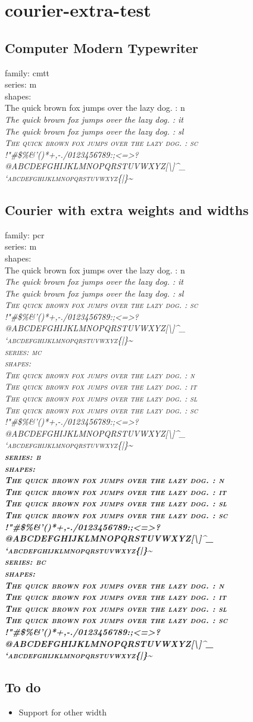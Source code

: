 \documentclass{article}
\makeatletter
\newcommand{\quickbrownfox}{%
\textparagraph{} The quick brown fox jumps over the lazy dog.}
\newcommand{\ascii}{ !"\#\$\%\&'()*+,-./0123456789:;<=>?\\
@ABCDEFGHIJKLMNOPQRSTUVWXYZ[\textbackslash{}]\textasciicircum{}\_\\
`abcdefghijklmnopqrstuvwxyz\{|\}\textasciitilde{}}
\newcommand{\shapes}{%
\bgroup
\upshape\quickbrownfox{} : n \\
\itshape\selectfont\quickbrownfox{} : it \\
\slshape\selectfont\quickbrownfox{} : sl \\
\scshape\selectfont\quickbrownfox{} : sc \\
\noindent\ascii \\
\egroup}
\makeatother
\begin{document}
\section{courier-extra-test}

\subsection{Computer Modern Typewriter}

\normalfont
{}\selectfont
family: cmtt \\
series: m \\
shapes: \\
\shapes
\normalfont

\subsection{Courier with extra weights and widths}

\normalfont
{}\selectfont
family: pcr \\
%
\mdseries
series: m \\
shapes: \\
\shapes
%
\selectfont
series: mc \\
shapes: \\
\shapes
%
\bfseries
series: b \\
shapes: \\
\shapes
%
\selectfont
series: bc \\
shapes: \\
\shapes
\normalfont

\subsection{To do}
\begin{itemize}
  \item Support for other width
\end{itemize}
\end{document}
